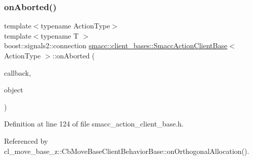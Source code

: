\subsubsection{\texorpdfstring{on\+Aborted()}{onAborted()}\hspace{0.1cm}{\footnotesize\ttfamily [1/2]}}
{\footnotesize\ttfamily template$<$typename Action\+Type$>$ \\
template$<$typename T $>$ \\
boost\+::signals2\+::connection \hyperlink{classsmacc_1_1client__bases_1_1SmaccActionClientBase}{smacc\+::client\+\_\+bases\+::\+Smacc\+Action\+Client\+Base}$<$ Action\+Type $>$\+::on\+Aborted (\begin{DoxyParamCaption}\item[{void(T\+::$\ast$)(Result\+Const\+Ptr \&)}]{callback,  }\item[{T $\ast$}]{object }\end{DoxyParamCaption})\hspace{0.3cm}{\ttfamily [inline]}}



Definition at line 124 of file smacc\+\_\+action\+\_\+client\+\_\+base.\+h.



Referenced by cl\+\_\+move\+\_\+base\+\_\+z\+::\+Cb\+Move\+Base\+Client\+Behavior\+Base\+::on\+Orthogonal\+Allocation().


